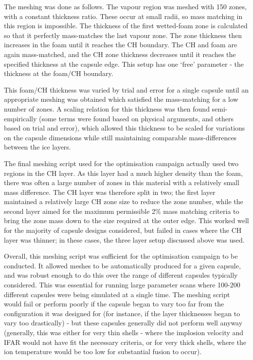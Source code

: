 The meshing was done as follows. The vapour region was meshed with 150 zones, with a constant thickness ratio. These occur at small radii, so mass matching in this region is impossible. The thickness of the first wetted-foam zone is calculated so that it perfectly mass-matches the last vapour zone. The zone thickness then increases in the foam until it reaches the CH boundary. The CH and foam are again mass-matched, and the CH zone thickness decreases until it reaches the specified thickness at the capsule edge. This setup has one `free' parameter - the thickness at the foam/CH boundary.

This foam/CH thickness was varied by trial and error for a single capsule until an appropriate meshing was obtained which satisfied the mass-matching for a low number of zones. A scaling relation for this thickness was then found semi-empirically (some terms were found based on physical arguments, and others based on trial and error), which allowed this thickness to be scaled for variations on the capsule dimensions while still maintaining comparable mass-differences between the ice layers.

The final meshing script used for the optimisation campaign actually used two regions in the CH layer. As this layer had a much higher density than the foam, there was often a large number of zones in this material with a relatively small mass difference. The CH layer was therefore split in two; the first layer maintained a relatively large CH zone size to reduce the zone number, while the second layer aimed for the maximum permissible 2\% mass matching criteria to bring the zone mass down to the size required at the outer edge. This worked well for the majority of capsule designs considered, but failed in cases where the CH layer was thinner; in these cases, the three layer setup discussed above was used.

Overall, this meshing script was sufficient for the optimisation campaign to be conducted. It allowed meshes to be automatically produced for a given capsule, and was robust enough to do this over the range of different capsules typically considered. This was essential for running large parameter scans where 100-200 different capsules were being simulated at a single time. The meshing script would fail or perform poorly if the capsule began to vary too far from the configuration it was designed for (for instance, if the layer thicknesses began to vary too drastically) - but these capsules generally did not perform well anyway (generally, this was either for very thin shells - where the implosion velocity and IFAR would not have fit the necessary criteria, or for very thick shells, where the ion temperature would be too low for substantial fusion to occur).


